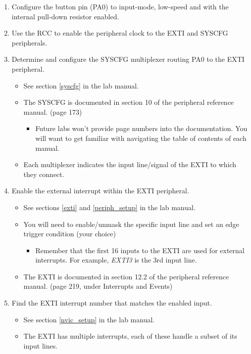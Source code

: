 \documentclass[11pt,fleqn]{book} %
\begin{document}
\begin{enumerate}
    \item Configure the button pin (PA0) to input-mode, low-speed and with the internal pull-down resistor enabled. 
    \item Use the RCC to enable the peripheral clock to the EXTI and SYSCFG peripherals.
    \item Determine and configure the SYSCFG multiplexer routing PA0 to the EXTI peripheral.
    \begin{itemize}
        \item See section \ref{syscfg} in the lab manual.
        \item The SYSCFG is documented in section 10 of the peripheral reference manual. (page 173)
        \begin{itemize}
            \item Future labs won't provide page numbers into the documentation. You will want to get familiar with navigating the table of contents of each manual.
        \end{itemize}
        \item Each multiplexer indicates the input line/signal of the EXTI to which they connect.
    \end{itemize}
    \item Enable the external interrupt within the EXTI peripheral.
    \begin{itemize}
        \item See sections \ref{exti} and \ref{periph_setup} in the lab manual.
        \item  You will need to enable/unmask the specific input line and set an edge trigger condition (your choice)
        \begin{itemize}
            \item Remember that the first 16 inputs to the EXTI are used for external interrupts. For example, \textit{EXTI3} is the 3rd input line. 
        \end{itemize}
        \item The EXTI is documented in section 12.2 of the peripheral reference manual. (page 219, under Interrupts and Events)
    \end{itemize}
    \item Find the EXTI interrupt number that matches the enabled input.
    \begin{itemize}
        \item  See section \ref{nvic_setup} in the lab manual.
        \item The EXTI has multiple interrupts, each of these handle a subset of its input lines.

\end{itemize}
\end{enumerate}
\end{document}
